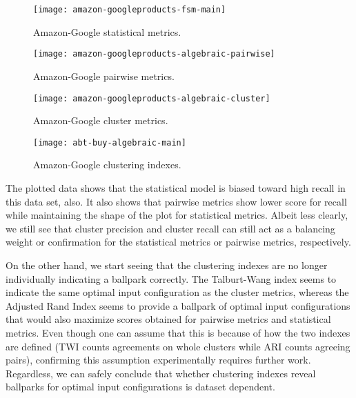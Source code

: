 \begin{figure*}[h]
    \begin{minipage}{0.24\textwidth}
        \centering
        \texttt{[image: amazon-googleproducts-fsm-main]}
        \caption{Amazon-Google statistical metrics.}
        \label{fig:amazon-googleproducts-fsm-main}
    \end{minipage}
    \begin{minipage}{0.24\textwidth}
        \centering
        \texttt{[image: amazon-googleproducts-algebraic-pairwise]}
        \caption{Amazon-Google pairwise metrics.}
        \label{fig:amazon-googleproducts-algebraic-pairwise}
    \end{minipage}
    \begin{minipage}{0.24\textwidth}
        \centering
        \texttt{[image: amazon-googleproducts-algebraic-cluster]}
        \caption{Amazon-Google cluster metrics.}
        \label{fig:amazon-googleproducts-algebraic-cluster}
    \end{minipage}
    \begin{minipage}{0.24\textwidth}
        \centering
        \texttt{[image: abt-buy-algebraic-main]}
        \caption{Amazon-Google clustering indexes.}
        \label{fig:amazon-googleproducts-algebraic-main}
    \end{minipage}
\end{figure*}\label{amazon-google}

The plotted data shows that the statistical model is biased toward high recall
in this data set, also.
It also shows that pairwise metrics show lower score for recall while
maintaining the shape of the plot for statistical metrics.
Albeit less clearly, we still see that cluster precision and cluster recall can
still act as a balancing weight or confirmation for the statistical metrics or
pairwise metrics, respectively.

On the other hand, we start seeing that the clustering indexes are no longer
individually indicating a ballpark correctly.
The Talburt-Wang index seems to indicate the same optimal input configuration as
the cluster metrics, whereas the Adjusted Rand Index seems to provide a ballpark
of optimal input configurations that would also maximize scores obtained for
pairwise metrics and statistical metrics.
Even though one can assume that this is because of how the two indexes are
defined (TWI counts agreements on whole clusters while ARI counts agreeing
pairs), confirming this assumption experimentally requires further work.
Regardless, we can safely conclude that whether clustering indexes reveal
ballparks for optimal input configurations is dataset dependent.

